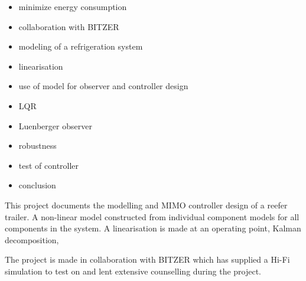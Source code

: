 \begin{itemize}
	\item minimize energy consumption
	\item collaboration with BITZER
	\item modeling of a refrigeration system
	\item linearisation
	\item use of model for observer and controller design
	\item LQR
	\item Luenberger observer
	\item robustness
	\item test of controller
	\item conclusion
\end{itemize}

This project documents the modelling and MIMO controller design of a reefer trailer. A non-linear model constructed from individual component models for all components in the system. A linearisation is made at an operating point, Kalman decomposition,  

The project is made in collaboration with BITZER which has supplied a Hi-Fi simulation to test on and lent extensive counselling during the project.